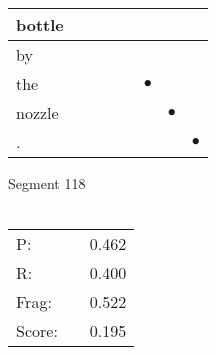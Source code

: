\documentclass[landscape]{article}
\newcommand{\ssp}{\hspace{2pt}}
\newcommand{\mex}{\cellcolor{g}$\bullet$}
\begin{document}
\begin{tabular}{|l|p{10pt}|p{10pt}|p{10pt}|p{10pt}|p{10pt}|p{10pt}|p{10pt}|}
\hline
\ssp bottle \ssp&\hspace{2pt}&\hspace{2pt}&\hspace{2pt}&\hspace{2pt}&\hspace{2pt}&\hspace{2pt}&\hspace{2pt}\\
\hline
\ssp by \ssp&\hspace{2pt}&\hspace{2pt}&\hspace{2pt}&\hspace{2pt}&\hspace{2pt}&\hspace{2pt}&\hspace{2pt}\\
\hline
\ssp \cellcolor{ref4}the \ssp&\hspace{2pt}&\hspace{2pt}&\hspace{2pt}&\hspace{2pt}&\hspace{2pt}\mex&\hspace{2pt}&\hspace{2pt}\\
\hline
\ssp \cellcolor{ref5}nozzle \ssp&\hspace{2pt}&\hspace{2pt}&\hspace{2pt}&\hspace{2pt}&\hspace{2pt}&\hspace{2pt}\mex&\hspace{2pt}\\
\hline
\ssp \cellcolor{ref6}. \ssp&\hspace{2pt}&\hspace{2pt}&\hspace{2pt}&\hspace{2pt}&\hspace{2pt}&\hspace{2pt}&\hspace{2pt}\mex\\
\hline
\end{tabular}

\vspace{6pt}
\noindent Segment 118\\\\
\noindent\begin{tabular}{lm{12pt}r}
\hline
P:&&0.462\\
R:&&0.400\\
Frag:&&0.522\\
Score:&&0.195\\
\end{tabular}
\end{document}
